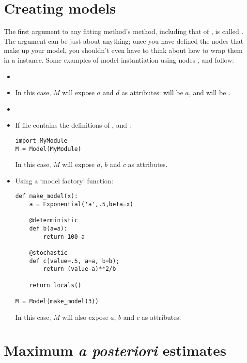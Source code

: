 \section{Creating models} \label{sec:ModelInstantiation}
The first argument to any fitting method's  method, including that of , is called . The  argument can be just about anything; once you have defined the nodes that make up your model, you shouldn't even have to think about how to wrap them in a  instance. Some examples of model instantiation using nodes ,  and  follow:
\begin{itemize}
    \item {}
    \item {} In this case, $M$ will expose $a$ and $d$ as attributes:  will be $a$, and  will be \code{[b,c]}.   
    \item {}
    \item If file  contains the definitions of ,  and :
   \begin{verbatim}
import MyModule
M = Model(MyModule)
    \end{verbatim}
    In this case, $M$ will expose $a$, $b$ and $c$ as attributes.
    \item Using a `model factory' function:
    \begin{verbatim}
def make_model(x):
    a = Exponential('a',.5,beta=x)
    
    @deterministic
    def b(a=a):
        return 100-a
    
    @stochastic
    def c(value=.5, a=a, b=b);
        return (value-a)**2/b
        
    return locals()
    
M = Model(make_model(3))
    \end{verbatim}
    In this case, $M$ will also expose $a$, $b$ and $c$ as attributes.
\end{itemize}


\hypertarget{MAP}{}
\section{Maximum \emph{a posteriori} estimates} \label{sec:MAP}

